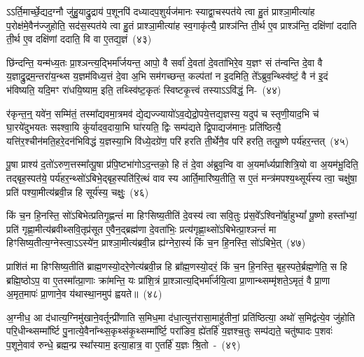 ऽ\-ऽर्ति॒मार्च्छे॒द्यद॒ग्नौ जु॑हु॒याद्रु॒द्राय॑ प॒शूनपि॑ दध्यादप॒शुर्यज॑मानः स्याद्वा॒चस्पत॑ये त्वा हु॒तं प्राश्ञा॒मीत्या॑ह प॒रोक्ष॑मे॒वैन॑ज्जुहोति॒ सद॑स॒स्पत॑ये त्वा हु॒तं प्राश्ञा॒मीत्या॑ह स्व॒गाकृ॑त्यै॒ प्राश्ञ॑न्ति ती॒र्थ ए॒व प्राश्ञ॑न्ति॒ दक्षि॑णां ददाति ती॒र्थ ए॒व दक्षि॑णां ददाति॒ वि वा ए॒तद्य॒ज्ञं~(४३)\ip

छि॑न्दन्ति॒ यन्म॑ध्य॒तः प्रा॒श्ञन्त्य॒द्भिर्मा᳚र्जयन्त॒ आपो॒ वै सर्वा॑ दे॒वता॑ दे॒वता॑भिरे॒व य॒ज्ञꣳ सं त॑न्वन्ति दे॒वा वै य॒ज्ञाद्रु॒द्रम॒न्तरा॑य॒न्थ्स य॒ज्ञम॑विध्य॒त्तं दे॒वा अ॒भि सम॑गच्छन्त॒ कल्प॑तां न इ॒दमिति॒ ते᳚\-ऽब्रुव॒न्थ्स्वि॑ष्टं॒ वै न॑ इ॒दं भ॑विष्यति॒ यदि॒मꣳ रा॑धयि॒ष्याम॒ इति॒ तथ्स्वि॑ष्ट॒कृतः॑ स्विष्टकृ॒त्त्वं तस्या\-ऽऽ\-वि॑द्धं॒ नि-~(४४)\ip

र॑कृन्त॒न्॒ यवे॑न॒ सम्मि॑तं॒ तस्मा᳚द्यवमा॒त्रमव॑ द्ये॒द्यज्ज्यायो॑\-ऽव॒द्येद्रो॒पये॒त्तद्य॒ज्ञस्य॒ यदुप॑ च स्तृणी॒याद॒भि च॑ घा॒रये॑दुभयतः सꣴश्वा॒यि कु॑र्यादव॒दाया॒भि घा॑रयति॒ द्विः सम्प॑द्यते द्वि॒पाद्यज॑मानः॒ प्रति॑ष्ठित्यै॒ यत्ति॑र॒श्चीन॑मति॒हरे॒दन॑भिविद्धं य॒ज्ञस्या॒भि वि॑ध्ये॒दग्रे॑ण॒ परि॑ हरति ती॒र्थेनै॒व परि॑ हरति॒ तत्पू॒ष्णे पर्य॑हर॒न्तत्~(४५)\ip

पू॒षा प्राश्य॑ द॒तो॑\-ऽरुण॒त्तस्मा᳚त्पू॒षा प्र॑पि॒ष्टभा॑गो\-ऽद॒न्तको॒ हि तं दे॒वा अ॑ब्रुव॒न्वि वा अ॒यमा᳚र्ध्यप्राशित्रि॒यो वा अ॒यम॑भू॒दिति॒ तद्बृह॒स्पत॑ये॒ पर्य॑हर॒न्थ्सो॑\-ऽबिभे॒द्बृह॒स्पति॑रि॒त्थं वाव स्य आर्ति॒\-मारि॑\-ष्य॒\-तीति॒ स ए॒तं मन्त्र॑मपश्य॒थ्सूर्य॑स्य त्वा॒ चक्षु॑षा॒ प्रति॑ पश्या॒मीत्य॑ब्रवी॒न्न हि सूर्य॑स्य॒ चक्षुः॒~(४६)\ip

किं च॒न हि॒नस्ति॒ सो॑\-ऽबिभेत्प्रतिगृ॒ह्णन्तं॑ मा हिꣳसिष्य॒तीति॑ दे॒वस्य॑ त्वा सवि॒तुः प्र॑स॒वे᳚\-ऽश्विनो᳚र्बा॒हु\-भ्यां᳚ पू॒ष्णो हस्ता᳚भ्यां॒ प्रति॑ गृह्णा॒मीत्य॑ब्रवीथ्सवि॒तृप्र॑सूत ए॒वैन॒द्ब्रह्म॑णा दे॒वता॑भिः॒ प्रत्य॑\-गृह्णा॒थ्सो॑\-ऽबिभेत्प्रा॒श्ञन्तं॑ मा हिꣳसिष्य॒तीत्य॒ग्नेस्त्वा॒\-ऽऽ\-\-स्ये॑न॒ प्राश्ञा॒मीत्य॑ब्रवी॒न्न ह्य॑ग्नेरा॒स्यं॑ किं च॒न हि॒नस्ति॒ सो॑\-ऽबिभे॒त्~(४७)\ip

प्राशि॑तं मा हिꣳसिष्य॒तीति॑ ब्राह्म॒णस्यो॒दरे॒णेत्य॑ब्रवी॒न्न हि ब्रा᳚ह्म॒णस्यो॒दरं॒ किं च॒न हि॒नस्ति॒ बृह॒स्पते॒र्ब्रह्म॒णेति॒ स हि ब्रह्मि॒ष्ठो\-ऽप॒ वा ए॒तस्मा᳚त्प्रा॒णाः क्रा॑मन्ति॒ यः प्रा॑शि॒त्रं प्रा॒श्ञात्य॒द्भिर्मा᳚र्जयि॒त्वा प्रा॒णान्थ्सम्मृ॑शते॒\-ऽमृतं॒ वै प्रा॒णा अ॒मृत॒मापः॑ प्रा॒णाने॒व य॑थास्था॒नमुप॑ ह्वयते॥~(४८)\ip

{\anuvakamend[{प्रा॒श्ञी॒याद्धोता॑ य॒ज्ञं निर॑हर॒न्तच्चक्षु॑रा॒स्य॑ङ्किं च॒न हि॒नस्ति॒ सो॑\-ऽबिभे॒च्चतु॑श्चत्वारिꣳशच्च}]}

अ॒ग्नीध॒ आ द॑धात्य॒ग्निमु॑खाने॒वर्तून्प्री॑णाति स॒मिध॒मा द॑धा॒त्युत्त॑रासा॒माहु॑तीनां॒ प्रति॑ष्ठित्या॒ अथो॑ स॒मिद्व॑त्ये॒व जु॑होति परि॒धीन्थ्सम्मा᳚र्ष्टि पु॒नात्ये॒वैना᳚न्थ्स॒कृथ्स॑कृ॒थ्सम्मा᳚र्ष्टि॒ परा॑ङिव॒ ह्ये॑तर्\mbox{}हि॑ य॒ज्ञश्च॒तुः सम्प॑द्यते॒ चतु॑ष्पादः प॒शवः॑ प॒शूने॒वाव॑ रुन्धे॒ ब्रह्म॒न्प्र स्था᳚स्याम॒ इत्या॒हात्र॒ वा ए॒तर्\mbox{}हि॑ य॒ज्ञः श्रि॒तो~-~(४९)\ip

